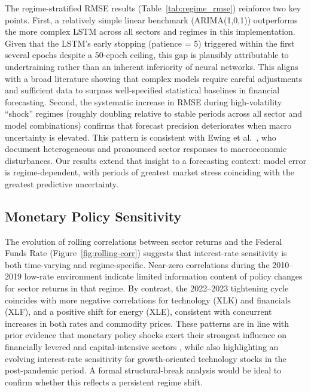 \documentclass[12pt]{article}
\begin{document}
The regime-stratified RMSE results (Table~\ref{tab:regime_rmse}) reinforce two key points. First, a relatively simple linear benchmark (ARIMA(1,0,1)) outperforms the more complex LSTM across all sectors and regimes in this implementation. Given that the LSTM's early stopping (patience = 5) triggered within the first several epochs despite a 50-epoch ceiling, this gap is plausibly attributable to undertraining rather than an inherent inferiority of neural networks. This aligns with a broad literature showing that complex models require careful adjustments and sufficient data to surpass well-specified statistical baselines in financial forecasting.
\vspace{0.5cm}
Second, the systematic increase in RMSE during high-volatility “shock” regimes (roughly doubling relative to stable periods across all sector and model combinations) confirms that forecast precision deteriorates when macro uncertainty is elevated. This pattern is consistent with Ewing et al.\ \cite{ewing2003}, who document heterogeneous and pronounced sector responses to macroeconomic disturbances. Our results extend that insight to a forecasting context: model error is regime-dependent, with periods of greatest market stress coinciding with the greatest predictive uncertainty.

\subsection{Monetary Policy Sensitivity}

The evolution of rolling correlations between sector returns and the Federal Funds Rate (Figure~\ref{fig:rolling-corr}) suggests that interest-rate sensitivity is both time-varying and regime-specific. Near-zero correlations during the 2010--2019 low-rate environment indicate limited information content of policy changes for sector returns in that regime. By contrast, the 2022--2023 tightening cycle coincides with more negative correlations for technology (XLK) and financials (XLF), and a positive shift for energy (XLE), consistent with concurrent increases in both rates and commodity prices. These patterns are in line with prior evidence that monetary policy shocks exert their strongest influence on financially levered and capital-intensive sectors \cite{ewing2003}, while also highlighting an evolving interest-rate sensitivity for growth-oriented technology stocks in the post-pandemic period. A formal structural-break analysis would be ideal to confirm whether this reflects a persistent regime shift.
\end{document}
